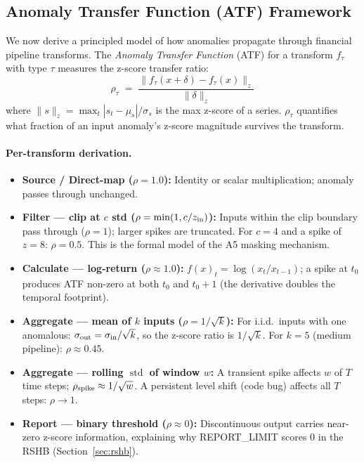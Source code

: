 \documentclass{article}
\begin{document}
\subsection{Anomaly Transfer Function (ATF) Framework}
\label{sec:atf}

We now derive a principled model of how anomalies propagate through financial
pipeline transforms.
The \emph{Anomaly Transfer Function} (ATF) for a transform $f_\tau$ with type
$\tau$ measures the z-score transfer ratio:
\begin{equation}
  \rho_\tau \;=\; \frac{\|f_\tau(x + \delta) - f_\tau(x)\|_z}{\|\delta\|_z}
  \label{eq:rho}
\end{equation}
where $\|s\|_z = \max_t |s_t - \mu_s|/\sigma_s$ is the max z-score of a series.
$\rho_\tau$ quantifies what fraction of an input anomaly's z-score magnitude
survives the transform.

\paragraph{Per-transform derivation.}
\begin{itemize}
\item \textbf{Source / Direct-map ($\rho = 1.0$):}
  Identity or scalar multiplication; anomaly passes through unchanged.
\item \textbf{Filter — clip at $c$ std ($\rho = \min(1, c/z_{\rm in})$):}
  Inputs within the clip boundary pass through ($\rho = 1$);
  larger spikes are truncated.
  For $c = 4$ and a spike of $z = 8$: $\rho = 0.5$.
  This is the formal model of the A5 masking mechanism.
\item \textbf{Calculate — log-return ($\rho \approx 1.0$):}
  $f(x)_t = \log(x_t/x_{t-1})$; a spike at $t_0$ produces ATF non-zero
  at both $t_0$ and $t_0{+}1$ (the derivative doubles the temporal footprint).
\item \textbf{Aggregate — mean of $k$ inputs ($\rho = 1/\sqrt{k}$):}
  For i.i.d.\ inputs with one anomalous: $\sigma_{\rm out} = \sigma_{\rm in}/\sqrt{k}$,
  so the z-score ratio is $1/\sqrt{k}$.
  For $k = 5$ (medium pipeline): $\rho \approx 0.45$.
\item \textbf{Aggregate — rolling $\operatorname{std}$ of window $w$:}
  A transient spike affects $w$ of $T$ time steps;
  $\rho_{\rm spike} \approx 1/\sqrt{w}$.
  A persistent level shift (code bug) affects all $T$ steps: $\rho \to 1$.
\item \textbf{Report — binary threshold ($\rho \approx 0$):}
  Discontinuous output carries near-zero z-score information,
  explaining why REPORT\_LIMIT scores 0 in the RSHB (Section~\ref{sec:rshb}).
\end{itemize}
\end{document}
